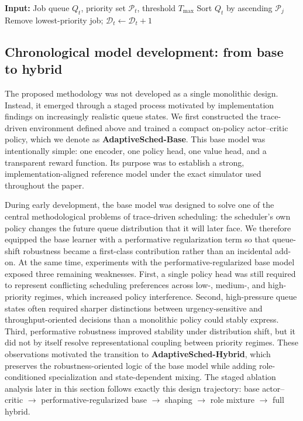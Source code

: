 \documentclass[journal]{IEEEtran}
\begin{document}
\begin{algorithm}[ht]
\caption{Victim Selection Under Overload Rule}
\label{alg:victim}
\begin{algorithmic}[1]
\State \textbf{Input:} Job queue $Q_t$, priority set $\mathcal{P}_t$, threshold $T_{\max}$
  \State Sort $Q_t$ by ascending $\mathcal{P}_j$
    \State Remove lowest-priority job; $\mathcal{D}_t \leftarrow \mathcal{D}_t + 1$
  \EndWhile
\EndIf
\end{algorithmic}
\end{algorithm}

\subsection{Chronological model development: from base to hybrid}
The proposed methodology was not developed as a single monolithic design. Instead, it emerged through a staged process motivated by implementation findings on increasingly realistic queue states. We first constructed the trace-driven environment defined above and trained a compact on-policy actor--critic policy, which we denote as \textbf{AdaptiveSched-Base}. This base model was intentionally simple: one encoder, one policy head, one value head, and a transparent reward function. Its purpose was to establish a strong, implementation-aligned reference model under the exact simulator used throughout the paper.

During early development, the base model was designed to solve one of the central methodological problems of trace-driven scheduling: the scheduler’s own policy changes the future queue distribution that it will later face. We therefore equipped the base learner with a performative regularization term so that queue-shift robustness became a first-class contribution rather than an incidental add-on. At the same time, experiments with the performative-regularized base model exposed three remaining weaknesses. First, a single policy head was still required to represent conflicting scheduling preferences across low-, medium-, and high-priority regimes, which increased policy interference. Second, high-pressure queue states often required sharper distinctions between urgency-sensitive and throughput-oriented decisions than a monolithic policy could stably express. Third, performative robustness improved stability under distribution shift, but it did not by itself resolve representational coupling between priority regimes. These observations motivated the transition to \textbf{AdaptiveSched-Hybrid}, which preserves the robustness-oriented logic of the base model while adding role-conditioned specialization and state-dependent mixing. The staged ablation analysis later in this section follows exactly this design trajectory: base actor--critic $\rightarrow$ performative-regularized base $\rightarrow$ shaping $\rightarrow$ role mixture $\rightarrow$ full hybrid.
\end{document}
